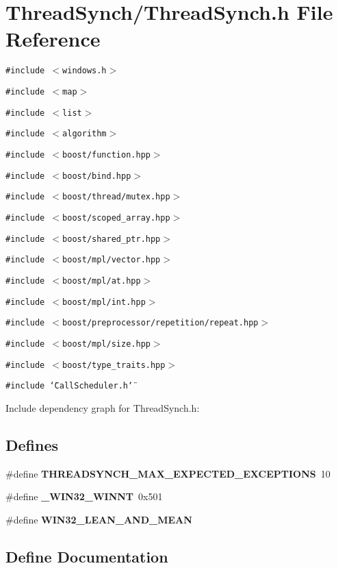\section{Thread\-Synch/Thread\-Synch.h File Reference}
\label{_thread_synch_8h}
{\tt \#include $<$windows.h$>$}\par
{\tt \#include $<$map$>$}\par
{\tt \#include $<$list$>$}\par
{\tt \#include $<$algorithm$>$}\par
{\tt \#include $<$boost/function.hpp$>$}\par
{\tt \#include $<$boost/bind.hpp$>$}\par
{\tt \#include $<$boost/thread/mutex.hpp$>$}\par
{\tt \#include $<$boost/scoped\_\-array.hpp$>$}\par
{\tt \#include $<$boost/shared\_\-ptr.hpp$>$}\par
{\tt \#include $<$boost/mpl/vector.hpp$>$}\par
{\tt \#include $<$boost/mpl/at.hpp$>$}\par
{\tt \#include $<$boost/mpl/int.hpp$>$}\par
{\tt \#include $<$boost/preprocessor/repetition/repeat.hpp$>$}\par
{\tt \#include $<$boost/mpl/size.hpp$>$}\par
{\tt \#include $<$boost/type\_\-traits.hpp$>$}\par
{\tt \#include \char`\"{}Call\-Scheduler.h\char`\"{}}\par


Include dependency graph for Thread\-Synch.h:\subsection*{Defines}
\begin{CompactItemize}
\item 
\#define {\bf THREADSYNCH\_\-MAX\_\-EXPECTED\_\-EXCEPTIONS}~10
\item 
\#define {\bf \_\-WIN32\_\-WINNT}~0x501
\item 
\#define {\bf WIN32\_\-LEAN\_\-AND\_\-MEAN}
\end{CompactItemize}


\subsection{Define Documentation}
